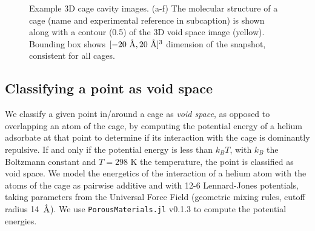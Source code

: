 \documentclass[journal=jacsat,manuscript=article,layout=traditional]{achemso}
\newcommand{\angstrom}{\mbox{\normalfont\AA}}
\begin{document}
\begin{figure}
	\caption{Example 3D cage cavity images. {\color{red} (a-f)} The molecular structure of a cage {\color{red} (name and experimental reference in subcaption)} is shown along with a contour (0.5) of the 3D void space image (yellow). Bounding box shows $[-20 \text{ } \angstrom, 20 \text{ } \angstrom]^3$ dimension of the snapshot, consistent for all cages.
	} \label{fig:raw3Dimages}
\end{figure}


\subsection{Classifying a point as void space} We classify a given point in/around a cage as \emph{void space}, as opposed to overlapping an atom of the cage, by computing the potential energy of a helium adsorbate at that point to determine if its interaction with the cage is dominantly repulsive. If and only if the potential energy is less than $k_BT$, with $k_B$ the Boltzmann constant and $T=298$ K the temperature, the point is classified as void space. We model the energetics of the interaction of a helium atom with the atoms of the cage as pairwise additive and with 12-6 Lennard-Jones potentials, taking parameters from the Universal Force Field \cite{rappe1992uff} (geometric mixing rules, cutoff radius 14~$\angstrom$). We use \texttt{PorousMaterials.jl} v0.1.3 \cite{PorousMaterialsJL} to compute the potential energies.
\end{document}

